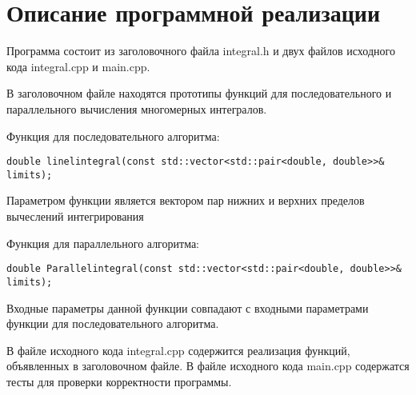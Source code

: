 \documentclass{report}
\begin{document}
\section*{Описание программной реализации}
Программа состоит из заголовочного файла integral.h и двух файлов исходного кода integral.cpp и main.cpp.
\par В заголовочном файле находятся прототипы функций для последовательного и параллельного вычисления многомерных интегралов.
\par Функция для последовательного алгоритма:
\begin{lstlisting}
double linelintegral(const std::vector<std::pair<double, double>>& limits);
\end{lstlisting}
 Параметром функции является вектором пар нижних и верхних пределов вычеслений интегрирования
\par Функция для параллельного
алгоритма:
\begin{lstlisting}
double Parallelintegral(const std::vector<std::pair<double, double>>& limits);
\end{lstlisting}
Входные параметры данной функции совпадают с входными параметрами функции для последовательного алгоритма.
\par В файле исходного кода integral.cpp содержится реализация функций, объявленных в заголовочном файле. В файле исходного кода main.cpp содержатся тесты для проверки корректности программы.
\newpage

\end{document}
